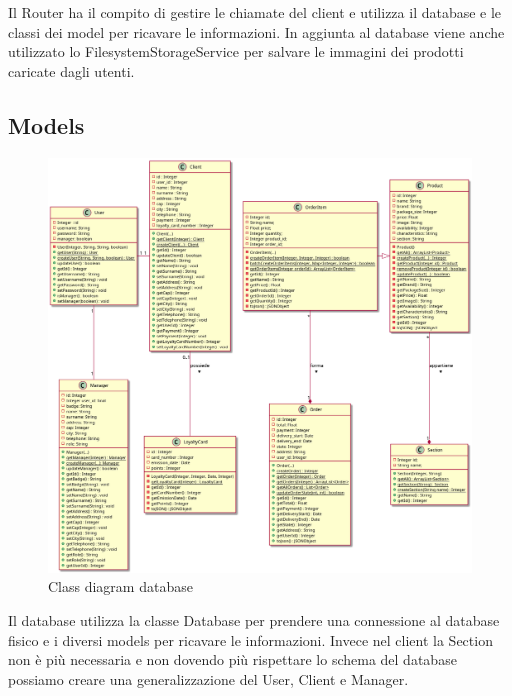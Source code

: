\documentclass[12pt, a4paper]{report}
\begin{document}
Il Router ha il compito di gestire le chiamate del client e utilizza il database
e le classi dei model per ricavare le informazioni. In aggiunta al database 
viene anche utilizzato lo FilesystemStorageService per salvare le immagini dei 
prodotti caricate dagli utenti.

\newpage

\subsection{Models}

\begin{figure}[h]
  \centering
  \includegraphics[width=\textwidth]{database_models_class.png}
  \caption{Class diagram database}
\end{figure}

Il database utilizza la classe Database per prendere una connessione al database fisico e i diversi models per ricavare le informazioni. Invece nel client la Section non è più necessaria e non dovendo più rispettare lo schema del database possiamo creare una generalizzazione del User, Client e Manager.

\newpage
\end{document}
